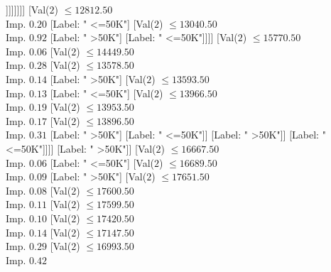 \documentclass[margin=10pt]{standalone}
\begin{document}
\begin{forest}
																				[Val($2$) $ \leq 11615.50$ \\ Imp. $0.13$
																					[Label: " >50K"]
																					[Val($2$) $ \leq 11912.50$ \\ Imp. $0.08$
																						[Label: " <=50K"]
																						[Val($2$) $ \leq 12001.50$ \\ Imp. $0.25$
																							[Label: " >50K"]
																							[Label: " <=50K"]]]]]]]]
																[Val($2$) $ \leq 12812.50$ \\ Imp. $0.20$
																	[Label: " <=50K"]
																	[Val($2$) $ \leq 13040.50$ \\ Imp. $0.92$
																		[Label: " >50K"]
																		[Label: " <=50K"]]]]
															[Val($2$) $ \leq 15770.50$ \\ Imp. $0.06$
																[Val($2$) $ \leq 14449.50$ \\ Imp. $0.28$
																	[Val($2$) $ \leq 13578.50$ \\ Imp. $0.14$
																		[Label: " >50K"]
																		[Val($2$) $ \leq 13593.50$ \\ Imp. $0.13$
																			[Label: " <=50K"]
																			[Val($2$) $ \leq 13966.50$ \\ Imp. $0.19$
																				[Val($2$) $ \leq 13953.50$ \\ Imp. $0.17$
																					[Val($2$) $ \leq 13896.50$ \\ Imp. $0.31$
																						[Label: " >50K"]
																						[Label: " <=50K"]]
																					[Label: " >50K"]]
																				[Label: " <=50K"]]]]
																	[Label: " >50K"]]
																[Val($2$) $ \leq 16667.50$ \\ Imp. $0.06$
																	[Label: " <=50K"]
																	[Val($2$) $ \leq 16689.50$ \\ Imp. $0.09$
																		[Label: " >50K"]
																		[Val($2$) $ \leq 17651.50$ \\ Imp. $0.08$
																			[Val($2$) $ \leq 17600.50$ \\ Imp. $0.11$
																				[Val($2$) $ \leq 17599.50$ \\ Imp. $0.10$
																					[Val($2$) $ \leq 17420.50$ \\ Imp. $0.14$
																						[Val($2$) $ \leq 17147.50$ \\ Imp. $0.29$
																							[Val($2$) $ \leq 16993.50$ \\ Imp. $0.42$

\end{forest}
\end{document}
